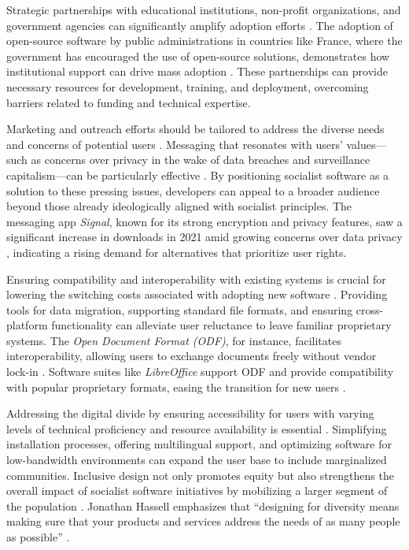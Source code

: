 \begin{refsection}
Strategic partnerships with educational institutions, non-profit organizations, and government agencies can significantly amplify adoption efforts \cite[pp.~136--139]{Restakis2010}. The adoption of open-source software by public administrations in countries like France, where the government has encouraged the use of open-source solutions, demonstrates how institutional support can drive mass adoption \cite{OSOR2017}. These partnerships can provide necessary resources for development, training, and deployment, overcoming barriers related to funding and technical expertise.

Marketing and outreach efforts should be tailored to address the diverse needs and concerns of potential users \cite[pp.~34--36]{Kotler2009}. Messaging that resonates with users' values—such as concerns over privacy in the wake of data breaches and surveillance capitalism—can be particularly effective \cite[pp.~8--10]{Zuboff2019}. By positioning socialist software as a solution to these pressing issues, developers can appeal to a broader audience beyond those already ideologically aligned with socialist principles. The messaging app \textit{Signal}, known for its strong encryption and privacy features, saw a significant increase in downloads in 2021 amid growing concerns over data privacy \cite{BBCNews2021}, indicating a rising demand for alternatives that prioritize user rights.

Ensuring compatibility and interoperability with existing systems is crucial for lowering the switching costs associated with adopting new software \cite[pp.~12--14]{Porter1998}. Providing tools for data migration, supporting standard file formats, and ensuring cross-platform functionality can alleviate user reluctance to leave familiar proprietary systems. The \textit{Open Document Format (ODF)}, for instance, facilitates interoperability, allowing users to exchange documents freely without vendor lock-in \cite{ODFAlliance}. Software suites like \textit{LibreOffice} support ODF and provide compatibility with popular proprietary formats, easing the transition for new users \cite{LibreOffice2021}.

Addressing the digital divide by ensuring accessibility for users with varying levels of technical proficiency and resource availability is essential \cite[pp.~12--15]{Norris2001}. Simplifying installation processes, offering multilingual support, and optimizing software for low-bandwidth environments can expand the user base to include marginalized communities. Inclusive design not only promotes equity but also strengthens the overall impact of socialist software initiatives by mobilizing a larger segment of the population \cite[pp.~10--12]{Hassell2015}. Jonathan Hassell emphasizes that ``designing for diversity means making sure that your products and services address the needs of as many people as possible'' \cite[pp.~11]{Hassell2015}.


\end{refsection}
